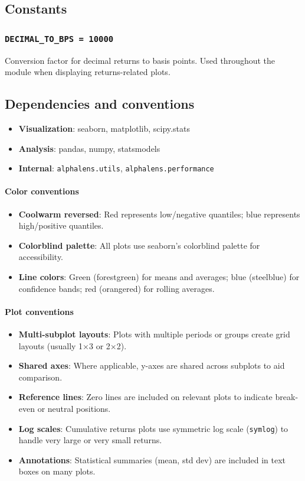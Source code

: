 \documentclass[11pt]{article}
\begin{document}
\subsection{Constants}

\subsubsection{\texttt{DECIMAL\_TO\_BPS = 10000}}
Conversion factor for decimal returns to basis points. Used throughout the module when displaying returns-related plots.

\subsection{Dependencies and conventions}

\begin{itemize}
  \item \textbf{Visualization}: seaborn, matplotlib, scipy.stats
  \item \textbf{Analysis}: pandas, numpy, statsmodels
  \item \textbf{Internal}: \texttt{alphalens.utils}, \texttt{alphalens.performance}
\end{itemize}

\paragraph{Color conventions}
\begin{itemize}
  \item \textbf{Coolwarm reversed}: Red represents low/negative quantiles; blue represents high/positive quantiles.
  \item \textbf{Colorblind palette}: All plots use seaborn's colorblind palette for accessibility.
  \item \textbf{Line colors}: Green (forestgreen) for means and averages; blue (steelblue) for confidence bands; red (orangered) for rolling averages.
\end{itemize}

\paragraph{Plot conventions}
\begin{itemize}
  \item \textbf{Multi-subplot layouts}: Plots with multiple periods or groups create grid layouts (usually 1\(\times\)3 or 2\(\times\)2).
  \item \textbf{Shared axes}: Where applicable, y-axes are shared across subplots to aid comparison.
  \item \textbf{Reference lines}: Zero lines are included on relevant plots to indicate break-even or neutral positions.
  \item \textbf{Log scales}: Cumulative returns plots use symmetric log scale (\texttt{symlog}) to handle very large or very small returns.
  \item \textbf{Annotations}: Statistical summaries (mean, std dev) are included in text boxes on many plots.
\end{itemize}
\end{document}
